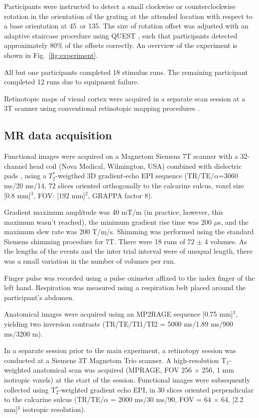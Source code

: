 Participants were instructed to detect a small clockwise or counterclockwise rotation in the orientation of the grating at the attended location with respect to a base orientation at 45\textdegree~or 135\textdegree. The size of rotation offset was adjusted with an adaptive staircase procedure using QUEST \cite{Watson1983}, such that participants detected approximately 80\% of the offsets correctly. An overview of the experiment is shown in Fig.~\ref{fig:experiment}.

All but one participants completed 18 stimulus runs. The remaining participant completed 12 runs due to equipment failure.

Retinotopic maps of visual cortex were acquired in a separate scan session at a 3T scanner using conventional retinotopic mapping procedures \cite{Sereno1995,DeYoe1996,Engel1997}. 


\subsection{MR data acquisition}
Functional images were acquired on a Magnetom Siemens 7T scanner with a 32-channel head coil (Nova Medical, Wilmington, USA) combined with dielectric pads \cite{Teeuwisse2012}, using a $T_2^*$-weigthed 3D gradient-echo EPI sequence \cite{Poser2010} (TR/TE/$\alpha$=3060 ms/20 ms/14\textdegree, 72 slices oriented orthogonally to the calcarine sulcus, voxel size [0.8 mm]$^3$, FOV: [192 mm]$^2 $, GRAPPA factor 8).

Gradient maximum amplitude was 40 mT/m (in practice, however, this maximum wasn't reached), the minimum gradient rise time was 200 $\mu$s, and the maximum slew rate was 200 T/m/s. Shimming was performed using the standard Siemens shimming procedure for 7T. There were 18 runs of 72 $\pm$ 4 volumes. As the lengths of the events and the inter trial interval were of unequal length, there was a small variation in the number of volumes per run.

Finger pulse was recorded using a pulse oximeter affixed to the index finger of the left hand. Respiration was measured using a respiration belt placed around the participant's abdomen.

Anatomical images were acquired using an MP2RAGE sequence \cite{Marques2010} [0.75 mm]$^3$, yielding two inversion contrasts (TR/TE/TI1/TI2 = 5000 ms/1.89 ms/900 ms/3200 m).

In a separate session prior to the main experiment, a retinotopy session was conducted at a Siemens 3T Magnetom Trio scanner. A high-resolution T$_1$-weighted anatomical scan was acquired (MPRAGE, FOV 256 $\times$ 256, 1 mm isotropic voxels) at the start of the session. Functional images were subsequently collected using T$_2^*$-weighted gradient echo EPI, in 30 slices oriented perpendicular to the calcarine sulcus (TR/TE/$\alpha$ = 2000 ms/30 ms/90\textdegree, FOV = 64 $\times$ 64, [2.2 mm]$^3$ isotropic resolution).


